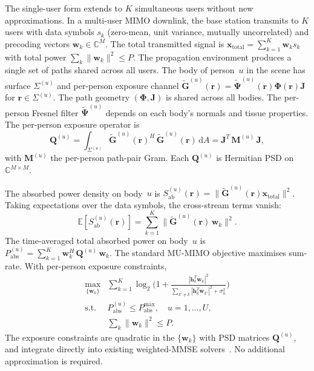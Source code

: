 \documentclass[journal,twocolumn,10pt]{IEEEtran}
\theoremstyle{plain}
\theoremstyle{remark}
\newcommand{\rr}{\mathbf{r}}
\newcommand{\xx}{\mathbf{x}}
\newcommand{\hh}{\mathbf{h}}
\newcommand{\Gtil}{\tilde{\mathbf{G}}}
\newcommand{\Qmat}{\mathbf{Q}}
\newcommand{\Mmat}{\mathbf{M}}
\newcommand{\Jmat}{\mathbf{J}}
\newcommand{\Phimat}{\mathbf{\Phi}}
\newcommand{\Psitil}{\tilde{\bm{\Psi}}}
\newcommand{\diff}{\mathrm{d}}
\newcommand{\Complex}{\mathbb{C}}
\begin{document}
The single-user form extends to $K$ simultaneous users without
new approximations. In a multi-user MIMO downlink, the base station
transmits to $K$ users with data symbols $s_k$ (zero-mean, unit
variance, mutually uncorrelated) and precoding vectors $\mathbf{w}_k
\in \Complex^M$. The total transmitted signal is $\xx_{\mathrm{total}}
= \sum_{k=1}^K \mathbf{w}_k s_k$ with total power $\sum_k
\|\mathbf{w}_k\|^2 \leq P$. The propagation environment produces a
single set of paths shared across all users. The body of person~$u$
in the scene has surface $\Sigma^{(u)}$ and per-person exposure
channel $\Gtil^{(u)}(\rr) = \Psitil^{(u)}(\rr) \Phimat(\rr) \Jmat$
for $\rr \in \Sigma^{(u)}$. The path geometry $(\Phimat, \Jmat)$ is
shared across all bodies. The per-person Fresnel filter
$\Psitil^{(u)}$ depends on each body's normals and tissue properties.
The per-person exposure operator is
\begin{equation}\label{eq:Q-u}
  \Qmat^{(u)} = \int_{\Sigma^{(u)}} \Gtil^{(u)}(\rr)^H\,
  \Gtil^{(u)}(\rr)\,\diff A
  = \Jmat^T\,\Mmat^{(u)}\,\Jmat,
\end{equation}
with $\Mmat^{(u)}$ the per-person path-pair Gram. Each $\Qmat^{(u)}$
is Hermitian PSD on $\Complex^{M \times M}$.

The absorbed power density on body~$u$ is
$S_{\mathrm{ab}}^{(u)}(\rr) = \|\Gtil^{(u)}(\rr)
\xx_{\mathrm{total}}\|^2$. Taking expectations over the data
symbols, the cross-stream terms vanish:
\begin{equation}\label{eq:Sab-MU}
  \mathbb{E}[S_{\mathrm{ab}}^{(u)}(\rr)]
  = \sum_{k=1}^K \|\Gtil^{(u)}(\rr)\,\mathbf{w}_k\|^2.
\end{equation}
The time-averaged total absorbed power on body~$u$ is
$P_{\mathrm{abs}}^{(u)} = \sum_{k=1}^K \mathbf{w}_k^H\,\Qmat^{(u)}\,
\mathbf{w}_k$. The standard MU-MIMO objective maximises sum-rate.
With per-person exposure constraints,
\begin{equation}\label{eq:MU-ECBF}
\begin{aligned}
  \max_{\{\mathbf{w}_k\}} {}&\sum_{k=1}^K \log_2\!\biggl(1 +
  \frac{|\hh_k^T \mathbf{w}_k|^2}{\sum_{k' \neq k}
  |\hh_k^T \mathbf{w}_{k'}|^2 + \sigma_n^2}\biggr) \\
  \text{s.t. } & P_{\mathrm{abs}}^{(u)} \leq P_{\mathrm{abs}}^{\max},
  \quad u = 1, \ldots, U, \\
  & \textstyle\sum_k \|\mathbf{w}_k\|^2 \leq P.
\end{aligned}
\end{equation}
The exposure constraints are quadratic in the $\{\mathbf{w}_k\}$
with PSD matrices $\Qmat^{(u)}$, and integrate directly into
existing weighted-MMSE solvers~\cite{Christensen2008,Shi2011}. No
additional approximation is required.
\end{document}
